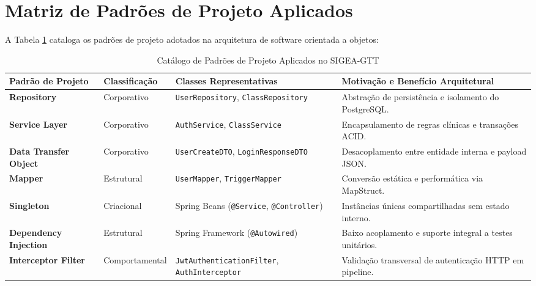 \section{Matriz de Padrões de Projeto Aplicados}
\label{sec_matriz_padroes_projeto}

A Tabela \ref{tab_padroes_projeto_classes} cataloga os padrões de projeto adotados na arquitetura de software orientada a objetos:

\begin{table}[!ht]
\centering
\caption{Catálogo de Padrões de Projeto Aplicados no SIGEA-GTT}
\label{tab_padroes_projeto_classes}
\footnotesize
\begin{tabularx}{\textwidth}{p{3.0cm} p{2.5cm} p{4.2cm} X}
\toprule
\textbf{Padrão de Projeto} & \textbf{Classificação} & \textbf{Classes Representativas} & \textbf{Motivação e Benefício Arquitetural} \\
\midrule
\textbf{Repository} & Corporativo & \texttt{UserRepository}, \texttt{ClassRepository} & Abstração de persistência e isolamento do PostgreSQL. \\
\textbf{Service Layer} & Corporativo & \texttt{AuthService}, \texttt{ClassService} & Encapsulamento de regras clínicas e transações ACID. \\
\textbf{Data Transfer Object} & Corporativo & \texttt{UserCreateDTO}, \texttt{LoginResponseDTO} & Desacoplamento entre entidade interna e payload JSON. \\
\textbf{Mapper} & Estrutural & \texttt{UserMapper}, \texttt{TriggerMapper} & Conversão estática e performática via MapStruct. \\
\textbf{Singleton} & Criacional & Spring Beans (\texttt{@Service}, \texttt{@Controller}) & Instâncias únicas compartilhadas sem estado interno. \\
\textbf{Dependency Injection} & Estrutural & Spring Framework (\texttt{@Autowired}) & Baixo acoplamento e suporte integral a testes unitários. \\
\textbf{Interceptor Filter} & Comportamental & \texttt{JwtAuthentication}\newline\texttt{Filter}, \texttt{AuthInterceptor} & Validação transversal de autenticação HTTP em pipeline. \\
\bottomrule
\end{tabularx}
\end{table}
